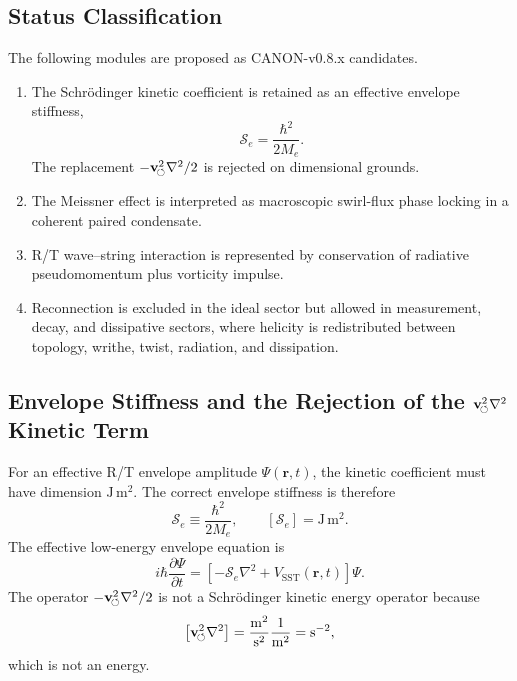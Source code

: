     \subsection{Status Classification}
        
        The following modules are proposed as CANON-v0.8.x candidates.
        
        \begin{enumerate}
            \item The Schrödinger kinetic coefficient is retained as an effective
            envelope stiffness,
            \[
                \mathcal S_e=\frac{\hbar^2}{2M_e}.
            \]
            The replacement \(-\mathbf{v}_{\!\boldsymbol{\circlearrowleft}}^2\nabla^2/2\) is rejected on dimensional grounds.
            
            \item The Meissner effect is interpreted as macroscopic swirl-flux phase
            locking in a coherent paired condensate.
            
            \item R/T wave--string interaction is represented by conservation of
            radiative pseudomomentum plus vorticity impulse.
            
            \item Reconnection is excluded in the ideal sector but allowed in
            measurement, decay, and dissipative sectors, where helicity is redistributed
            between topology, writhe, twist, radiation, and dissipation.
        \end{enumerate}
    
    \subsection{Envelope Stiffness and the Rejection of the \texorpdfstring{\(\mathbf{v}_{\!\boldsymbol{\circlearrowleft}}^2\nabla^2\)}{vswirl2 Laplacian} Kinetic Term}
        
        For an effective R/T envelope amplitude \(\Psi(\mathbf r,t)\), the kinetic
        coefficient must have dimension \(\mathrm{J\,m^2}\). The correct envelope
        stiffness is therefore
        \[
            \mathcal S_e
            \equiv
            \frac{\hbar^2}{2M_e},
            \qquad
            [\mathcal S_e]=\mathrm{J\,m^2}.
        \]
        The effective low-energy envelope equation is
        \[
            i\hbar\frac{\partial\Psi}{\partial t}
            =
            \left[
                -\mathcal S_e\nabla^2
            +
            V_{\mathrm{SST}}(\mathbf r,t)
            \right]\Psi .
        \]
        The operator \(-\mathbf{v}_{\!\boldsymbol{\circlearrowleft}}^2\nabla^2/2\) is not a Schrödinger kinetic energy
        operator because
        \[
            \left[\mathbf{v}_{\!\boldsymbol{\circlearrowleft}}^2\nabla^2\right]
            =
            \frac{\mathrm{m^2}}{\mathrm{s^2}}\frac{1}{\mathrm{m^2}}
            =
            \mathrm{s^{-2}},
        \]
        which is not an energy.
        
